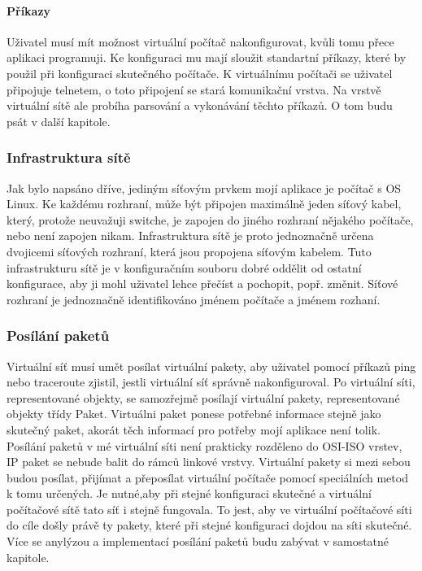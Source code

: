 \paragraph{Příkazy}
Uživatel musí mít možnost virtuální počítač nakonfigurovat, kvůli tomu přece aplikaci programuji. Ke konfiguraci mu mají sloužit standartní příkazy, které by použil při konfiguraci skutečného počítače. K virtuálnímu počítači se uživatel připojuje telnetem, o toto připojení se stará komunikační vrstva. Na vrstvě virtuální sítě ale probíha parsování a vykonávání těchto příkazů. O tom budu psát v další kapitole.
\subsubsection{Infrastruktura sítě}
Jak bylo napsáno dříve, jediným síťovým prvkem mojí aplikace je počítač s OS Linux. Ke každému rozhraní, může být připojen maximálně jeden síťový kabel, který, protože neuvažuji switche, je zapojen do jiného rozhraní nějakého počítače, nebo není zapojen nikam.  Infrastruktura sítě je proto jednoznačně určena dvojicemi síťových rozhraní, která jsou propojena síťovým kabelem. Tuto infrastrukturu sítě je v konfiguračním souboru dobré oddělit od ostatní konfigurace, aby ji mohl uživatel lehce přečíst a pochopit, popř. změnit. Síťové rozhraní je jednoznačně identifikováno jménem počítače a jménem rozhaní.
\subsubsection{Posílání paketů}
Virtuální síť musí umět posílat virtuální pakety, aby uživatel pomocí příkazů ping nebo traceroute zjistil, jestli virtuální síť správně nakonfiguroval. Po virtuální síti, representované objekty, se samozřejmě posílají virtuální pakety, representované objekty třídy Paket. Virtuálni paket ponese potřebné informace stejně jako skutečný paket, akorát těch informací pro potřeby mojí aplikace není tolik. Posílání paketů v mé virtuální síti není prakticky rozděleno do OSI-ISO vrstev, IP paket se nebude balit do rámců linkové vrstvy. Virtuální pakety si mezi sebou budou posílat, přijímat a přeposílat virtuální počítače pomocí speciálních metod k tomu určených. Je nutné,aby při stejné konfiguraci skutečné a virtuální počítačové sítě tato síť i stejně fungovala. To jest, aby ve virtuální počítačové síti do cíle došly právě ty pakety, které při stejné konfiguraci dojdou na síti skutečné. Více se anylýzou a implementací posílání paketů budu zabývat v samostatné kapitole.

